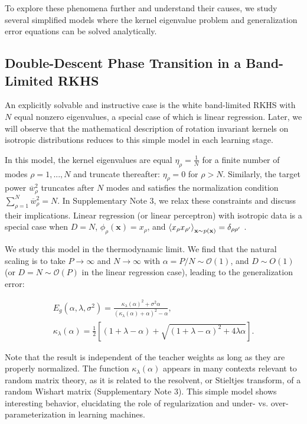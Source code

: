 \documentclass[11pt]{article}
\def\x{{\mathbf x}}
\begin{document}
To explore these phenomena further and understand their causes, we study several simplified models where the kernel eigenvalue problem and generalization error equations can be solved analytically. 




\subsection*{Double-Descent Phase Transition in a Band-Limited RKHS} 

An explicitly solvable and instructive case is the white band-limited RKHS with $N$ equal nonzero eigenvalues, a special case of which is linear regression. Later, we will observe that the mathematical description of rotation invariant kernels on isotropic distributions reduces to this simple model in each learning stage.

In this model, the kernel eigenvalues are equal $\eta_\rho = \frac{1}{N}$ for a finite number of modes $\rho=1,...,N$ and truncate thereafter: $\eta_\rho = 0$ for $\rho>N$. Similarly, the target power $\overline {w}_\rho^2$ truncates after $N$ modes and satisfies the normalization condition $\sum_{\rho=1}^N \overline{w}_\rho^2 = N$. In Supplementary Note 3, we relax these constraints and discuss their implications. Linear regression (or linear perceptron) with isotropic data is a special case when $D=N$, $\phi_{\rho}(\mathbf{x}) = x_{\rho}$, and $\braket{x_{\rho} x_{\rho'}}_{\x\sim p(\x)} = \delta_{\rho\rho'}$ \cite{krogh}.

We study this model in the thermodynamic limit. We find that the natural scaling is to take $P \to \infty$ and $N \to \infty$ with  $\alpha = P/N \sim \mathcal{O}(1)$, and $D \sim O(1)$ (or $D=N\sim\mathcal{O}(P)$ in the linear regression case), leading to the generalization error:
\begin{linenomath*}\begin{equation}\label{Egband}
\begin{gathered}
E_g(\alpha,\lambda,\sigma^2) = \frac{\kappa_\lambda(\alpha)^2+\sigma^2\alpha}{(\kappa_\lambda(\alpha)+\alpha)^2 - \alpha}, \\ 
\kappa_\lambda(\alpha)  = \frac{1}{2} \left[(1+{\lambda}-\alpha) + \sqrt{(1+\lambda-\alpha)^2 + 4\lambda \alpha} \right].
\end{gathered}
\end{equation}\end{linenomath*}
Note that the result is independent of the teacher weights as long as they are properly normalized. The function $\kappa_\lambda(\alpha)$ appears in many contexts relevant to random matrix theory, as it is related to the resolvent, or Stieltjes transform, of a random Wishart matrix \cite{bai_silverstein, Advani_Ganguli_optimal} (Supplementary Note 3). This simple model shows interesting behavior, elucidating the role of regularization and under- vs. over-parameterization in learning machines. 
\end{document}
